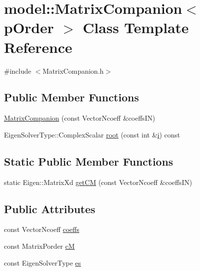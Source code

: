 \hypertarget{classmodel_1_1_matrix_companion}{}\section{model\+:\+:Matrix\+Companion$<$ p\+Order $>$ Class Template Reference}
\label{classmodel_1_1_matrix_companion}


{\ttfamily \#include $<$Matrix\+Companion.\+h$>$}

\subsection*{Public Member Functions}
\begin{DoxyCompactItemize}
\item 
\hyperlink{classmodel_1_1_matrix_companion_a3659c4e4dd36c75ad8c66c3d9e94cee4}{Matrix\+Companion} (const Vector\+Ncoeff \&coeffs\+I\+N)
\item 
Eigen\+Solver\+Type\+::\+Complex\+Scalar \hyperlink{classmodel_1_1_matrix_companion_ae46738e6215e35ea400df020daed860c}{root} (const int \&\hyperlink{_cubic_spline_intersection_8m_a6f6ccfcf58b31cb6412107d9d5281426}{i}) const 
\end{DoxyCompactItemize}
\subsection*{Static Public Member Functions}
\begin{DoxyCompactItemize}
\item 
static Eigen\+::\+Matrix\+Xd \hyperlink{classmodel_1_1_matrix_companion_ae1915046bc576dd0f9a62b658db4ca8c}{get\+C\+M} (const Vector\+Ncoeff \&coeffs\+I\+N)
\end{DoxyCompactItemize}
\subsection*{Public Attributes}
\begin{DoxyCompactItemize}
\item 
const Vector\+Ncoeff \hyperlink{classmodel_1_1_matrix_companion_a5f15838a7b111f1ba19ee2d16106236d}{coeffs}
\item 
const Matrix\+Porder \hyperlink{classmodel_1_1_matrix_companion_a8b6814bc0e757bb44d315c86a39afc73}{c\+M}
\item 
const Eigen\+Solver\+Type \hyperlink{classmodel_1_1_matrix_companion_a43bdf2e1a6a86e491dbcf7b2c50e45c9}{es}
\end{DoxyCompactItemize}


